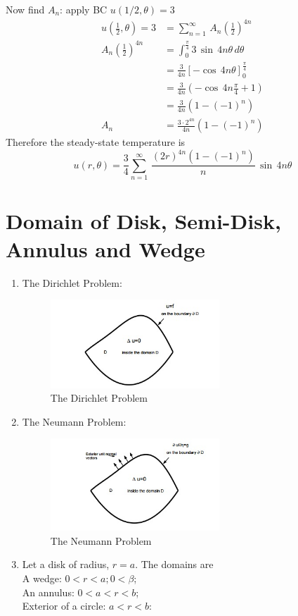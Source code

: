 Now find $A_n$: apply BC $u(1/2,\theta)=3$
\begin{align*}
u(\frac{1}{2},\theta)=3&=\sum_{n=1}^\infty\,A_n\left(\frac{1}{2}\right)^{4n}\\
A_n\left(\frac{1}{2}\right)^{4n}&=\int_0^{\frac{\pi}{4}}3\,\sin\,4n\theta\,d\theta\\
&=\frac{3}{4n}[-\cos\,4n\theta]_0^{\frac{\pi}{4}}\\
&=\frac{3}{4n}(-\cos\,4n\frac{\pi}{4}+1)\\
&=\frac{3}{4n}(1-(-1)^n)\\
A_n&=\frac{3\cdot 2^{4n}}{4n}(1-(-1)^n)
\end{align*}
Therefore the steady-state temperature is
\begin{equation}
u(r,\theta)=\frac{3}{4}\sum_{n=1}^\infty\,\frac{(2r)^{4n}(1-(-1)^n)}{n}\,\sin\,4n\theta
\end{equation}
\section{Domain of Disk, Semi-Disk, Annulus and Wedge}
\begin{enumerate}
\item The Dirichlet Problem:
\begin{figure}[hbt!]\centering
\includegraphics[width=0.6\textwidth]{domain1.jpg}
\caption{The Dirichlet Problem}
\end{figure}
\item The Neumann Problem:
\begin{figure}[hbt!]\centering
\includegraphics[width=0.6\textwidth]{domain2.jpg}
\caption{The Neumann Problem}
\end{figure}
\item Let a disk of radius, $r=a$. The domains are\\
A wedge: $0<r<a; 0 < \beta$;\\
An annulus: $0<a<r< b$;\\
Exterior of a circle: $a<r<b$:
\end{enumerate}

